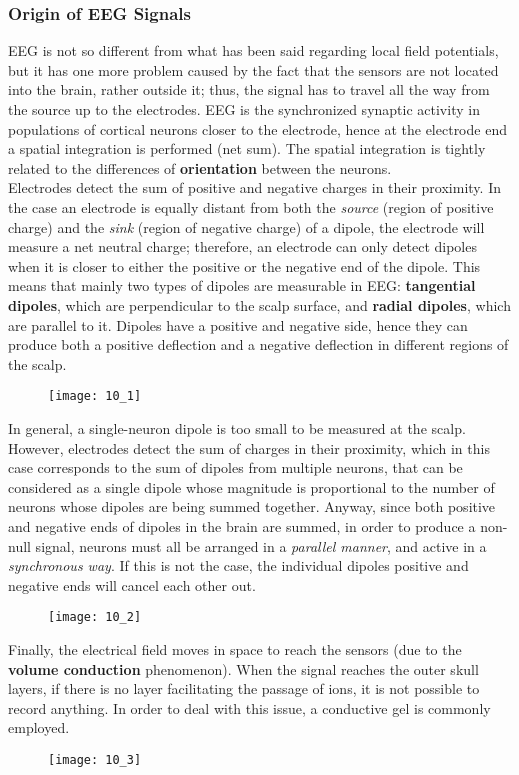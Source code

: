 \subsubsection{Origin of EEG Signals}
EEG is not so different from what has been said regarding local field potentials, but it has
one more problem caused by the fact that the sensors are not located into the brain, rather
outside it; thus, the signal has to travel all the way from the source up to the
electrodes. EEG is the synchronized synaptic activity in populations of cortical neurons
closer to the electrode, hence at the electrode end a spatial integration is performed (net
sum). The spatial integration is tightly related to the differences of \textbf{orientation}
between the neurons.\\
Electrodes detect the sum of positive and negative charges in their proximity. In the case
an electrode is equally distant from both the \textit{source} (region of positive charge) and the
\textit{sink} (region of negative charge) of a dipole, the electrode will measure a net
neutral charge; therefore, an electrode can only detect dipoles when it is closer to either
the positive or the negative end of the dipole. This means that mainly two types of dipoles
are measurable in EEG: \textbf{tangential dipoles}, which are perpendicular to the scalp
surface, and \textbf{radial dipoles}, which are parallel to it. Dipoles have a positive and
negative side, hence they can produce both a positive deflection and a negative deflection
in different regions of the scalp.
\begin{figure}[H]
    \texttt{[image: 10\_1]}
    \centering
\end{figure}
In general, a single-neuron dipole is too small to be measured at the scalp. However,
electrodes detect the sum of charges in their proximity, which in this case corresponds to
the sum of dipoles from multiple neurons, that can be considered as a single dipole whose
magnitude is proportional to the number of neurons whose dipoles are being summed together.
Anyway, since both positive and negative ends of dipoles in the brain are summed, in order to
produce a non-null signal, neurons must all be arranged in a \textit{parallel manner}, and
active in a \textit{synchronous way}. If this is not the case, the individual dipoles
positive and negative ends will cancel each other out.
\begin{figure}[H]
    \texttt{[image: 10\_2]}
    \centering
\end{figure}
Finally, the electrical field moves in space to reach the sensors (due to the
\textbf{volume conduction} phenomenon). When the signal reaches the outer skull layers, if
there is no layer facilitating the passage of ions, it is not possible to record anything.
In order to deal with this issue, a conductive gel is commonly employed.
\begin{figure}[H]
    \texttt{[image: 10\_3]}
    \centering
\end{figure}
